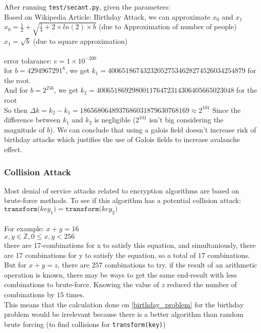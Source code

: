 \documentclass[fleqn, a4paper,12pt]{article}
\begin{document}
After running \texttt{test/secant.py}, given the parameters: \\
Based on Wikipedia Article: Birthday Attack, we can approximate $x_0$ and $x_1$ \\
$x_0 = \frac{1}{2}+\sqrt{\frac{1}{4}+2 \times ln(2) \times b}$ (due to Approximation of number of people) \\
$x_1 = \sqrt{b}$ (due to square approximation) \\
\\ error tolarance:
$e = 1 \times 10^{-200}$ \\
for $b=4294967291^8$,  we get $k_1 = 400651867432320527534628274526034254879$ for the root. \\
And for $b = 2^{256}$, we get $k_2 = 400651869298001176472314306405665023048$ for the root \\
So then $\Delta k = k_2 - k_1 = 1865680648937686031879630768169 \approx 2^{101}$
Since the difference between $k_1$ and $k_2$ is negligible ($2^{101}$ isn't big considering the magnitude of $b$). We can conclude  that using a galois field doesn't increase risk of birthday attacks which justifies the use of Galois fields to increase avalanche effect.

\subsubsection {Collision Attack} \label{collision_attack}

Most denial of service attacks related to encryption algorithms are based on brute-force methods. To see if this algorithm has a potential collision attack: \\
$\texttt{transform(} key_1 \texttt{)} = \texttt{transform(} key_2 \texttt{)}$ \\
\\
For example: $x + y = 16$ \\

$ x,y \in \mathbb{Z}, 0 \leq x,y < 256$ \\
there are 17-combinations for x to satisfy this equation, and simultaniously, there are 17 combinations for y to satisfy the equation, so a total of $17$ combinations.
\\
But for $x + y = z$, there are $257$ combinations to try. if the result of an arithmetic operation is known, there may be ways to get the same end-result with less combinations to brute-force. Knowing the value of $z$ reduced the number of combinations by $15$ times.
\\
This means that the calculation done on \ref{birthday_problem} for the birthday problem would be irrelevant because there is a better algorithm than random brute forcing (to find collisions for \texttt{transform(key)})
\end{document}
